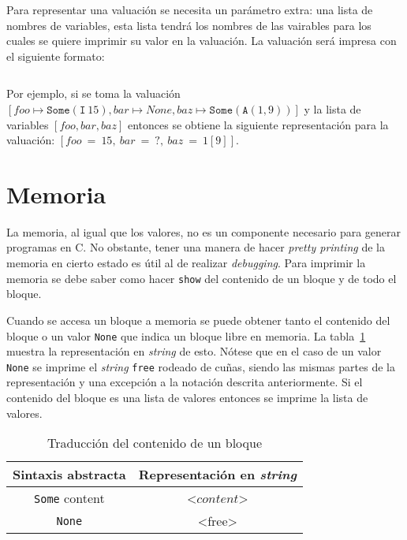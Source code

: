 Para representar una valuación se necesita un parámetro extra: una lista de nombres de variables, esta lista tendrá los nombres de las vairables para los cuales se quiere imprimir su valor en la valuación.
La valuación será impresa con el siguiente formato:

\begin{equation*}
[<vname_0> = <valor_0>, <vname_1> = <valor_1>, \dots, <vname_n> = <valor_n>]
\end{equation*}

Por ejemplo, si se toma la valuación $[foo \mapsto \mathtt{Some}(\mathtt{I}\ 15), bar \mapsto None, baz \mapsto \mathtt{Some}(\mathtt{A}(1,9))]$ y la lista de variables $[foo, bar, baz]$ entonces se obtiene la siguiente representación para la valuación: $[foo\ =\ 15,\ bar\ =\ ?,\ baz\ =\ 1[9]]$.


\section{Memoria}\label{section:pretty_memory}

La memoria, al igual que los valores, no es un componente necesario para generar programas en C.
No obstante, tener una manera de hacer \textit{pretty printing} de la memoria en cierto estado es útil al de realizar \textit{debugging}.
Para imprimir la memoria se debe saber como hacer \verb|show| del contenido de un bloque y de todo el bloque.

Cuando se accesa un bloque a memoria se puede obtener tanto el contenido del bloque o un valor \verb|None| que indica un bloque libre en memoria.
La tabla~\ref{tab:pretty_block_content} muestra la representación en \textit{string} de esto.
Nótese que en el caso de un valor \verb|None| se imprime el \textit{string} \verb|free| rodeado de cuñas, siendo las mismas partes de la representación y una excepción a la notación descrita anteriormente.
Si el contenido del bloque es una lista de valores entonces se imprime la lista de valores.

\begin{table}[h!]
\centering
\begin{tabular}{|c|c|}
  \hline
  \textbf{Sintaxis abstracta} & \textbf{Representación en \textit{string}} \\ [0.5ex]
  \hline \hline
  \verb|Some| content & <$content$> \\
  \verb|None| & <free> \\
  \hline
\end{tabular}

\caption{Traducción del contenido de un bloque}
\label{tab:pretty_block_content}
\end{table}

